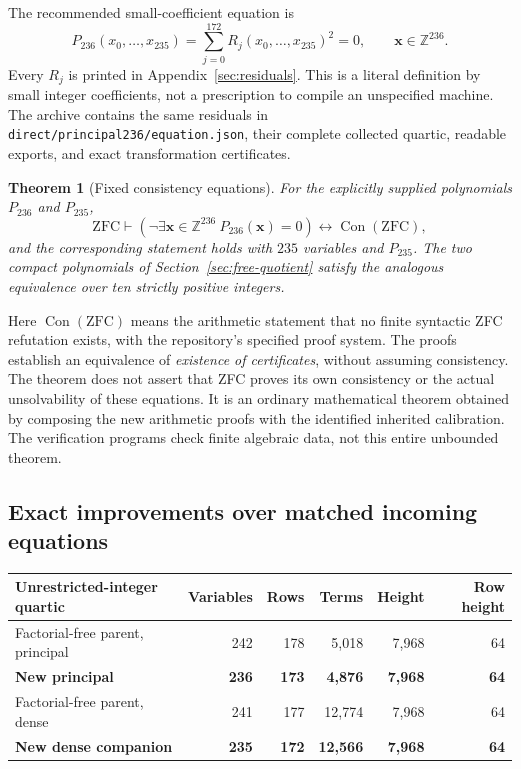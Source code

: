 \documentclass[11pt]{article}
\newtheorem{theorem}{Theorem}[section]
\theoremstyle{definition}
\newcommand{\Z}{\mathbb Z}
\newcommand{\Con}{\operatorname{Con}}
\begin{document}
The recommended small-coefficient equation is
\begin{equation}\label{eq:principal}
\boxed{\quad P_{236}(x_0,\ldots,x_{235})
   =\sum_{j=0}^{172}R_j(x_0,\ldots,x_{235})^2=0,
   \qquad \boldsymbol x\in\Z^{236}.\quad}
\end{equation}
Every $R_j$ is printed in Appendix~\ref{sec:residuals}. This is a literal
definition by small integer coefficients, not a prescription to compile
an unspecified machine. The archive contains the same residuals in
\nolinkurl{direct/principal236/equation.json}, their complete collected
quartic, readable exports, and exact transformation certificates.

\begin{theorem}[Fixed consistency equations]\label{thm:main}
For the explicitly supplied polynomials $P_{236}$ and $P_{235}$,
\[
\mathrm{ZFC}\vdash
\left(\neg\exists\boldsymbol x\in\Z^{236}\ P_{236}(\boldsymbol x)=0\right)
\longleftrightarrow\Con(\mathrm{ZFC}),
\]
and the corresponding statement holds with $235$ variables and $P_{235}$.
The two compact polynomials of Section~\ref{sec:free-quotient} satisfy
the analogous equivalence over ten strictly positive integers.
\end{theorem}

Here $\Con(\mathrm{ZFC})$ means the arithmetic statement that no finite
syntactic ZFC refutation exists, with the repository's specified proof
system. The proofs establish an equivalence of \emph{existence of
certificates}, without assuming consistency. The theorem does not assert
that ZFC proves its own consistency or the actual unsolvability of these
equations. It is an ordinary mathematical theorem obtained by composing
the new arithmetic proofs with the identified inherited calibration.
The verification programs check finite algebraic data, not this entire
unbounded theorem.

\subsection{Exact improvements over matched incoming equations}

\begin{center}\small
\begin{tabular}{lrrrrr}
\toprule
Unrestricted-integer quartic & Variables & Rows & Terms & Height & Row height\\
\midrule
Factorial-free parent, principal &242&178&5,018&7,968&64\\
\textbf{New principal} &\textbf{236}&\textbf{173}&\textbf{4,876}&\textbf{7,968}&\textbf{64}\\
Factorial-free parent, dense &241&177&12,774&7,968&64\\
\textbf{New dense companion} &\textbf{235}&\textbf{172}&\textbf{12,566}&\textbf{7,968}&\textbf{64}\\
\bottomrule
\end{tabular}
\end{center}
\end{document}
